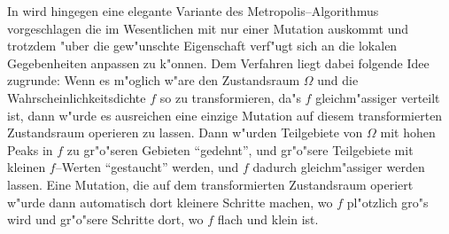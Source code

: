	In \citep{Kelemen:2002p8514} wird hingegen eine elegante Variante des Metropolis--Algorithmus vorgeschlagen die im Wesentlichen mit nur einer Mutation auskommt und trotzdem "uber die gew"unschte Eigenschaft verf"ugt sich an die lokalen Gegebenheiten anpassen zu k"onnen. Dem Verfahren liegt dabei folgende Idee zugrunde: Wenn es m"oglich w"are den Zustandsraum $\Omega$ und die Wahrscheinlichkeitsdichte $f$ so zu transformieren, 	da"s $f$ gleichm"assiger verteilt ist, dann w"urde es ausreichen eine einzige Mutation auf diesem transformierten Zustandsraum operieren zu lassen. Dann w"urden Teilgebiete von $\Omega$ mit hohen Peaks in $f$ zu gr"o"seren Gebieten ``gedehnt'', und gr"o"sere Teilgebiete mit kleinen $f$--Werten ``gestaucht'' werden, und $f$ dadurch gleichm"assiger werden lassen. Eine Mutation, die auf dem transformierten Zustandsraum operiert w"urde dann automatisch dort kleinere Schritte machen, wo $f$ pl"otzlich gro"s wird und gr"o"sere Schritte dort, wo $f$ flach und klein ist.
	
